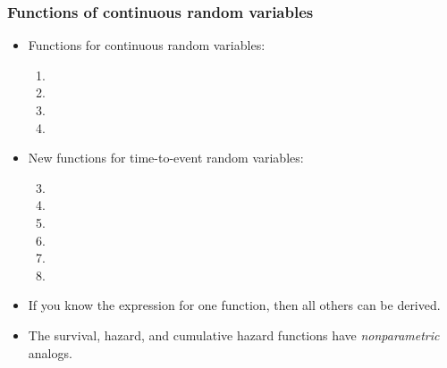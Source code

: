 \begin{frame}
\frametitle{Functions of continuous random variables}
\begin{itemize}
\item Functions for continuous random variables:
\begin{enumerate}
\item %
\item[]
\item %
\item[]
\end{enumerate}
\item New functions for time-to-event random variables:
\begin{enumerate}
    \setcounter{enumi}{2}
    \item %
    \item[]
    \item %
    \item[]
    \item %
    \item[]
\end{enumerate}
\item If you know the expression for one function, then all others can be derived.
\item The survival, hazard, and cumulative hazard functions have \emph{nonparametric} analogs.
\end{itemize}
\end{frame}


